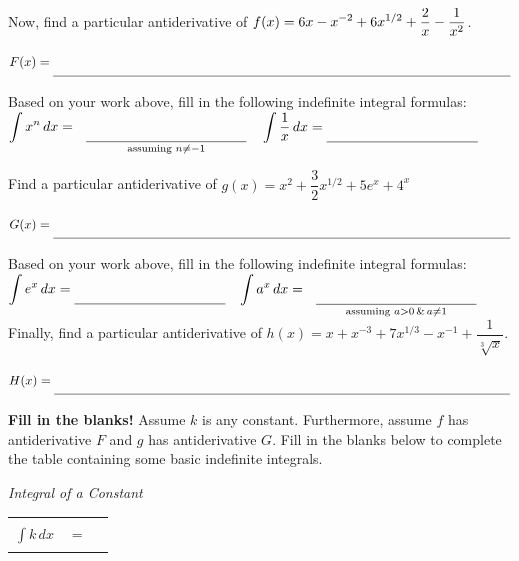 \documentclass[10pt]{article}
\begin{document}

Now, find a particular antiderivative of $\displaystyle f(x)=6x-x^{-2}+6x^{1/2}+\dfrac2x-\dfrac1{x^2}$.\\

\begin{center}
$F(x) = \unlineb{5}{}$
\end{center}
Based on your work above, fill in the following indefinite integral formulas:\\

$\dint x^n\,dx = \underset{\text{assuming }n\not=-1}{\text{\unlineb{1.5}{}}}$
\hfill
$\dint \frac1x\,dx = \unlineb{1.5}{}$

Find a particular antiderivative of $g(x) =x^2+ \dfrac{3}{2}x^{1/2}+5e^x+4^x$\\
\begin{center}
$G(x) = \unlineb{5}{}$
\end{center}


Based on your work above, fill in the following indefinite integral formulas:\\
$\dint e^x\,dx = \unlineb{1.5}{}$
\,\hfill
$\dint a^x\,dx =\underset{\text{assuming }a>0\,\&\,a\not=1}{\text{\unlineb{1.5}{}}}$
\,\hfill
{}\\
Finally, find a particular antiderivative of $h(x) = x + x^{-3} + 7x^{1/3} - x^{-1} + \dfrac{1}{\sqrt[3]{x}}$.\\
\begin{center}
$H(x) = \unlineb{5}{}$
\end{center}







\newpage%




{\bf\color{blue} Fill in the blanks!} Assume $k$ is any constant. Furthermore, assume $f$ has antiderivative $F$ and $g$ has antiderivative $G$. Fill in the blanks below to complete the table containing some basic indefinite integrals.

\begin{center}
{\it Integral of a Constant}\\[0.1in]
\begin{tabular}{ r c l}
$\displaystyle\int k\, dx$ & $=$ & \rule[-8pt]{1.75in}{0.4pt}
\end{tabular}
\end{center}
\end{document}
